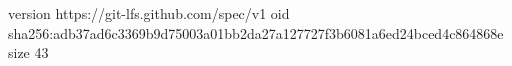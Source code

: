 version https://git-lfs.github.com/spec/v1
oid sha256:adb37ad6c3369b9d75003a01bb2da27a127727f3b6081a6ed24bced4c864868e
size 43
